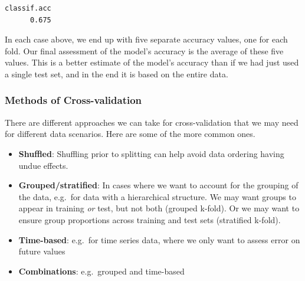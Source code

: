 \documentclass[
  letterpaper,
]{krantz}
\newenvironment{Shaded}{}{}
\newcommand{\CommentTok}[1]{\textcolor[rgb]{0.38,0.63,0.69}{\textit{#1}}}
\newcommand{\FunctionTok}[1]{\textcolor[rgb]{0.02,0.16,0.49}{#1}}
\newcommand{\NormalTok}[1]{#1}
\newcommand{\SpecialCharTok}[1]{\textcolor[rgb]{0.25,0.44,0.63}{#1}}
\newcommand{\StringTok}[1]{\textcolor[rgb]{0.25,0.44,0.63}{#1}}
\providecommand{\tightlist}{%
  \setlength{\itemsep}{0pt}\setlength{\parskip}{0pt}}\usepackage{longtable,booktabs,array}
\begin{document}
\begin{Shaded}
\end{Shaded}

\begin{verbatim}
classif.acc 
      0.675 
\end{verbatim}

In each case above, we end up with five separate accuracy values, one
for each fold. Our final assessment of the model's accuracy is the
average of these five values. This is a better estimate of the model's
accuracy than if we had just used a single test set, and in the end it
is based on the entire data.

\subsubsection{Methods of
Cross-validation}\label{methods-of-cross-validation}

There are different approaches we can take for cross-validation that we
may need for different data scenarios. Here are some of the more common
ones.

\begin{itemize}
\tightlist
\item
  \textbf{Shuffled}: Shuffling prior to splitting can help avoid data
  ordering having undue effects.
\item
  \textbf{Grouped/stratified}: In cases where we want to account for the
  grouping of the data, e.g.~for data with a hierarchical structure. We
  may want groups to appear in training \emph{or} test, but not both
  (grouped k-fold). Or we may want to ensure group proportions across
  training and test sets (stratified k-fold).
\item
  \textbf{Time-based}: e.g.~for time series data, where we only want to
  assess error on future values
\item
  \textbf{Combinations}: e.g.~grouped and time-based
\end{itemize}
\end{document}
